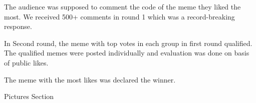 \documentclass[12pt, a4 paper]{article}
\begin{document}
\begin{center}
\begin{Large}
\begin{multicols}{2}
\end{multicols}

\begin{multicols}{2}

\columnbreak
The audience was supposed to comment the code of the meme they liked the most. We received 500+ comments in round 1 which was a record-breaking response.
  
\end{multicols} 

\begin{multicols}{2}
In Second round, the meme with top votes in each group in first round qualified.  The qualified memes were posted individually and evaluation was done on basis of public likes.

\columnbreak
  
\end{multicols} 

\begin{multicols}{2}

\columnbreak
 The meme with the most likes was declared the winner.
  
\end{multicols} 

\end{Large} 
\end{center}

\newpage 


\begin{center}
\Huge Pictures Section
\end{center}

\newpage 
\end{document}

